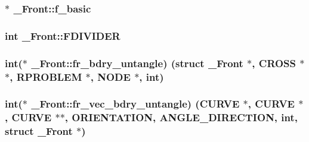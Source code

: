 \subsubsection[{\texorpdfstring{f\+\_\+basic}{f_basic}}]{$\ast$ \+\_\+\+Front\+::f\+\_\+basic}\hypertarget{struct___front_a6b75d1e79a1fe398c2b87f7634598166}{}\label{struct___front_a6b75d1e79a1fe398c2b87f7634598166}
\subsubsection[{\texorpdfstring{F\+D\+I\+V\+I\+D\+ER}{FDIVIDER}}]{\setlength{\rightskip}{0pt plus 5cm}int \+\_\+\+Front\+::\+F\+D\+I\+V\+I\+D\+ER}\hypertarget{struct___front_ae62bf663b3f5cf0d0bc61e873520488a}{}\label{struct___front_ae62bf663b3f5cf0d0bc61e873520488a}
\subsubsection[{\texorpdfstring{fr\+\_\+bdry\+\_\+untangle}{fr_bdry_untangle}}]{\setlength{\rightskip}{0pt plus 5cm}int($\ast$ \+\_\+\+Front\+::fr\+\_\+bdry\+\_\+untangle) (struct {\bf \+\_\+\+Front} $\ast$, {\bf C\+R\+O\+SS} $\ast$$\ast$, {\bf R\+P\+R\+O\+B\+L\+EM} $\ast$, {\bf N\+O\+DE} $\ast$, int)}\hypertarget{struct___front_a17401a50785c81c9f921e98bedf011ca}{}\label{struct___front_a17401a50785c81c9f921e98bedf011ca}
\subsubsection[{\texorpdfstring{fr\+\_\+vec\+\_\+bdry\+\_\+untangle}{fr_vec_bdry_untangle}}]{\setlength{\rightskip}{0pt plus 5cm}int($\ast$ \+\_\+\+Front\+::fr\+\_\+vec\+\_\+bdry\+\_\+untangle) ({\bf C\+U\+R\+VE} $\ast$, {\bf C\+U\+R\+VE} $\ast$, {\bf C\+U\+R\+VE} $\ast$$\ast$, {\bf O\+R\+I\+E\+N\+T\+A\+T\+I\+ON}, {\bf A\+N\+G\+L\+E\+\_\+\+D\+I\+R\+E\+C\+T\+I\+ON}, int, struct {\bf \+\_\+\+Front} $\ast$)}\hypertarget{struct___front_a1ebe129331a592855607b770111e079a}{}\label{struct___front_a1ebe129331a592855607b770111e079a}
